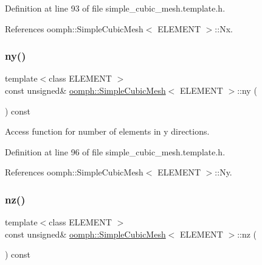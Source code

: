 Definition at line 93 of file simple\+\_\+cubic\+\_\+mesh.\+template.\+h.



References oomph\+::\+Simple\+Cubic\+Mesh$<$ E\+L\+E\+M\+E\+N\+T $>$\+::\+Nx.

\mbox{\label{classoomph_1_1SimpleCubicMesh_a16979ec3b0e88fb37730415190021c1c}} 
\subsubsection{\texorpdfstring{ny()}{ny()}}
{\footnotesize\ttfamily template$<$class E\+L\+E\+M\+E\+NT $>$ \\
const unsigned\& \hyperlink{classoomph_1_1SimpleCubicMesh}{oomph\+::\+Simple\+Cubic\+Mesh}$<$ E\+L\+E\+M\+E\+NT $>$\+::ny (\begin{DoxyParamCaption}{ }\end{DoxyParamCaption}) const\hspace{0.3cm}{\ttfamily [inline]}}



Access function for number of elements in y directions. 



Definition at line 96 of file simple\+\_\+cubic\+\_\+mesh.\+template.\+h.



References oomph\+::\+Simple\+Cubic\+Mesh$<$ E\+L\+E\+M\+E\+N\+T $>$\+::\+Ny.

\mbox{\label{classoomph_1_1SimpleCubicMesh_ad78725440e4e87598fd9339653b28e61}} 
\subsubsection{\texorpdfstring{nz()}{nz()}}
{\footnotesize\ttfamily template$<$class E\+L\+E\+M\+E\+NT $>$ \\
const unsigned\& \hyperlink{classoomph_1_1SimpleCubicMesh}{oomph\+::\+Simple\+Cubic\+Mesh}$<$ E\+L\+E\+M\+E\+NT $>$\+::nz (\begin{DoxyParamCaption}{ }\end{DoxyParamCaption}) const\hspace{0.3cm}{\ttfamily [inline]}}



